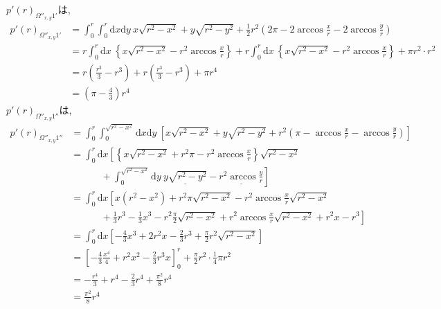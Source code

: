 $p'(r)_{\Omega''_{x,y}1'}$は,
\begin{align}
p'(r)_{\Omega''_{x,y}1'} &= \int^{r}_{0}\int^{r}_{0}\mathrm{d}x\mathrm{d}y\ x\sqrt{r^{2}-x^{2}} + y \sqrt{r^{2} -y^{2}} + \frac{1}{2}r^{2}\left( 2\pi -2\arccos\frac{x}{r} -2\arccos\frac{y}{r} \right) \nonumber \\
&= r\int^{r}_{0}\mathrm{d}x\ \left\{x\sqrt{r^{2}-x^{2}} - r^{2}\arccos\frac{x}{r} \right\} + r\int^{r}_{0}\mathrm{d}x\ \left\{x\sqrt{r^{2}-x^{2}} - r^{2}\arccos\frac{x}{r} \right\} + \pi r^{2}\cdot r^{2}\nonumber \\
&= r\left( \frac{r^{3}}{3} -r^{3} \right) + r\left( \frac{r^{3}}{3} -r^{3} \right) + \pi r^{4}\nonumber \\
&=  \left(\pi -\frac{4}{3}\right)r^{4}\label{eq:e12}
\end{align}
$p'(r)_{\Omega''_{x,y}1''}$は,
\begin{align}
p'(r)_{\Omega''_{x,y}1''} &= \int^{r}_{0}\int^{\sqrt{r^{2}-x^{2}}}_{0}\mathrm{d}x\mathrm{d}y\ \left[ x\sqrt{r^{2}-x^{2}} + y \sqrt{r^{2} -y^{2}} + r^{2}\left(\pi -\arccos\frac{x}{r} -\arccos\frac{y}{r}\right) \right]\nonumber \\
&= \int^{r}_{0}\mathrm{d}x\left[ \left\{ x\sqrt{r^{2}-x^{2}} + r^{2}\pi -r^{2}\arccos\frac{x}{r} \right\}\sqrt{r^{2}-x^{2}} \right. \nonumber\\
&\ \ \ \ \ \ \ \ \ \ \ \ \ \ + \left. \int^{\sqrt{r^{2}-x^{2}}}_{0}\mathrm{d}y\ \underline{y\sqrt{r^{2}-y^{2}}} -\underline{r^{2}\arccos\frac{y}{r}}\right]\nonumber \\
&= \int^{r}_{0}\mathrm{d}x\left[ x(r^{2}-x^{2}) + r^{2}\pi\sqrt{r^{2}-x^{2}} -r^{2}\arccos \frac{x}{r} \sqrt{r^{2}-x^{2}} \right. \nonumber \\
&\ \ \ \ \ \ \ \ \ \ \ \ \ \ + \left. \frac{1}{3}r^{3} - \frac{1}{3}x^{3} - r^{2}\frac{\pi}{2}\sqrt{r^{2}-x^{2}} + r^{2}\arccos\frac{x}{r}\sqrt{r^{2}-x^{2}} +r^{2}x - r^{3}\right] \nonumber \\
&= \int^{r}_{0}\mathrm{d}x \left[-\frac{4}{3}x^{3} + 2r^{2}x - \frac{2}{3}r^{3} + \frac{\pi}{2}r^{2}\sqrt{r^{2}-x^{2}} \right]\nonumber \\
&= \left[ -\frac{4}{3}\frac{x^{4}}{4} + r^{2}x^{2} - \frac{2}{3}r^{3}x \right]^{r}_{0} + \frac{\pi}{2}r^{2}\cdot \frac{1}{4}\pi r^{2}\nonumber \\
&= -\frac{r^{4}}{3} + r^{4} -\frac{2}{3}r^{4} + \frac{\pi ^{2}}{8}r^{4}\nonumber \\
&= \frac{\pi^{2}}{8}r^{4}\label{eq:e13}
\end{align}

